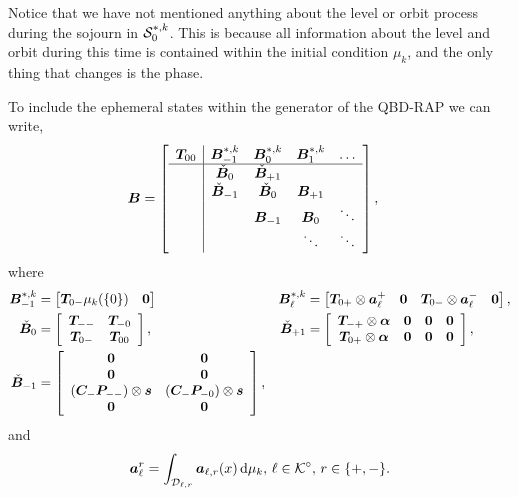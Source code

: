 Notice that we have not mentioned anything about the level or orbit process during the sojourn in \(\mathcal{S}_0^{*,k}\). This is because all information about the level and orbit during this time is contained within the initial condition \(\mu_k\), and the only thing that changes is the phase. 

To include the ephemeral states within the generator of the QBD-RAP we can write, 
\begin{align*}
	\boldsymbol B &=\left[\begin{array}{c|cccc}
		\boldsymbol T_{00} & \boldsymbol B_{-1}^{*,k} &\boldsymbol B_{0}^{*,k}&\boldsymbol B_{1}^{*,k} & \hdots \\\hline
		&\check{\boldsymbol B}_{0} &  \check{\boldsymbol B}_{+1} &&\\
		& \check{\boldsymbol B}_{-1}&\check{\boldsymbol B}_{0}&\boldsymbol B_{+1}& \\
		&&\boldsymbol B_{-1} & \boldsymbol B_0&\ddots \\
		&&&\ddots&\ddots 
	\end{array}\right],
\end{align*}
where 
\begin{align*}
	\boldsymbol B_{-1}^{*,k} &= \begin{bmatrix} \boldsymbol T_{0-}\mu_k(\{0\}) & \boldsymbol 0 \end{bmatrix} & \boldsymbol B_{\ell}^{*,k} &= \begin{bmatrix} \boldsymbol T_{0+}\otimes \boldsymbol a_\ell^+ & \boldsymbol 0 & \boldsymbol T_{0-}\otimes \boldsymbol a_\ell^- & \boldsymbol 0 \end{bmatrix},
	\\\check{\boldsymbol B}_{0} &= \left[\begin{array}{cc}\boldsymbol T_{--} & \boldsymbol T_{-0}\\\boldsymbol T_{0-} & \boldsymbol T_{00}\end{array}\right], 
	& \check{\boldsymbol B}_{+1} &= \left[\begin{array}{cccc}\boldsymbol T_{-+}\otimes \boldsymbol \alpha & \boldsymbol 0 & \boldsymbol 0 & \boldsymbol 0 \\ \boldsymbol T_{0+}\otimes \boldsymbol \alpha & \boldsymbol 0 & \boldsymbol 0 & \boldsymbol 0 \end{array}\right],
	\\\check{\boldsymbol B}_{-1} &= \left[\begin{array}{cc} \boldsymbol0&\boldsymbol0\\\boldsymbol0&\boldsymbol0\\(\boldsymbol C_-\boldsymbol P_{--})\otimes \boldsymbol s & (\boldsymbol C_-\boldsymbol P_{-0})\otimes \boldsymbol s \\\boldsymbol0&\boldsymbol0\end{array}\right], &&
\end{align*}
and 
\begin{align*}
	\boldsymbol a_\ell^r = \int_{\mathcal{D}_{\ell,r}} \boldsymbol a_{\ell,r}(x)\, \mathrm{d} \mu_k,\, \ell\in\mathcal K^\circ,\, r\in\{+,-\}. 
\end{align*}

